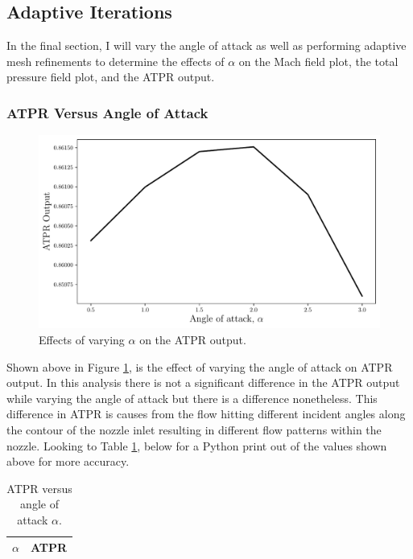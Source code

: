 \pagebreak
\subsection{Adaptive Iterations}

In the final section, I will vary the angle of attack as well as performing adaptive mesh refinements to determine the effects of $\alpha$ on the Mach field plot, the total pressure field plot, and the ATPR output. 

\subsubsection{ATPR Versus Angle of Attack}
\begin{figure}[h]
    \centering
    \includegraphics[width = 0.9\linewidth]{rep/q5/ATPR.pdf}
    \caption[ATPR and Angle of Attack]{Effects of varying $\alpha$ on the ATPR output.}
    \label{fig:aoa_ATPR}
\end{figure}

Shown above in Figure \ref{fig:aoa_ATPR}, is the effect of varying the angle of attack on ATPR output. In this analysis there is not a significant difference in the ATPR output while varying the angle of attack but there is a difference nonetheless. This difference in ATPR is causes from the flow hitting different incident angles along the contour of the nozzle inlet resulting in different flow patterns within the nozzle. Looking to Table \ref{tab:ATPR_alpha}, below for a Python print out of the values shown above for more accuracy.

\begin{table}[h]
    \centering
    \caption[ATPR Versus Angle of Attack]{ATPR versus angle of attack $\alpha$.}
    \label{tab:ATPR_alpha}
    \begin{tabular}{c|l}
        $\alpha$ & ATPR\\ \hline\hline
        
    \end{tabular}
\end{table}

